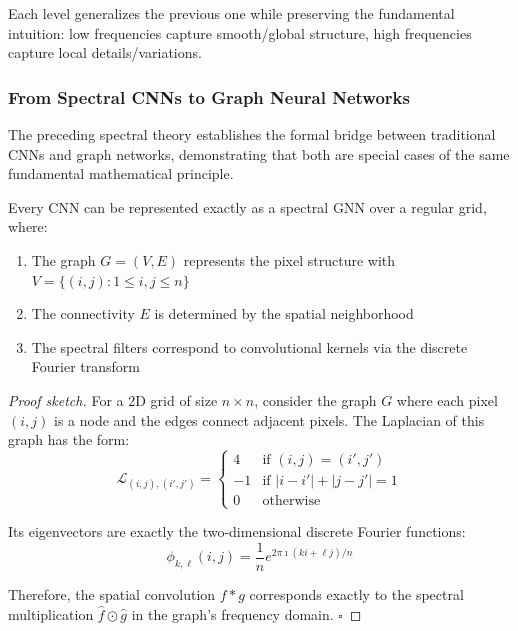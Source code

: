 Each level generalizes the previous one while preserving the fundamental intuition: low frequencies capture smooth/global structure, high frequencies capture local details/variations.

\subsubsection{From Spectral CNNs to Graph Neural Networks}

The preceding spectral theory establishes the formal bridge between traditional \glspl{CNN} and graph networks, demonstrating that both are special cases of the same fundamental mathematical principle.

\begin{theorem}\label{thm:conexion_fundamental_cnn_gnn}
Every \gls{CNN} can be represented exactly as a spectral \gls{GNN} over a regular grid, where:
\begin{enumerate}
    \item The graph $G = (V, E)$ represents the pixel structure with $V = \{(i,j) : 1 \leq i,j \leq n\}$
    \item The connectivity $E$ is determined by the spatial neighborhood
    \item The spectral filters correspond to convolutional kernels via the discrete Fourier transform
\end{enumerate}
\end{theorem}

\begin{proof}[Proof sketch]
For a 2D grid of size $n \times n$, consider the graph $G$ where each pixel $(i,j)$ is a node and the edges connect adjacent pixels. The Laplacian of this graph has the form:
\[
\mathcal{L}_{(i,j),(i',j')} = \begin{cases}
4 & \text{if } (i,j) = (i',j') \\
-1 & \text{if } |i-i'| + |j-j'| = 1 \\
0 & \text{otherwise}
\end{cases}
\]

Its eigenvectors are exactly the two-dimensional discrete Fourier functions:
\[
\phi_{k,\ell}(i,j) = \frac{1}{n} e^{2\pi \imath (ki + \ell j)/n}
\]

Therefore, the spatial convolution $f * g$ corresponds exactly to the spectral multiplication $\hat{f} \odot \hat{g}$ in the graph's frequency domain. $\square$
\end{proof}

